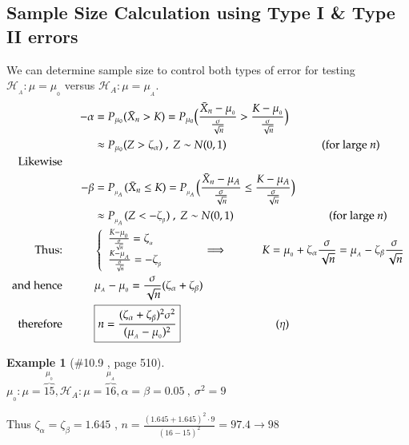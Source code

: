 \documentclass[14pt,twoside,a4paper,fleqn]{article}
\theoremstyle{plain}
\newtheorem{example}{Example}[section]
\begin{document}
\subsection{Sample Size Calculation using Type I \& Type II errors}
We can determine sample size to control both types of error for testing \mbox{$\mathcal{H}_{_A}:\mu=\mu_{_0}$} versus $\mathcal{H}_A: \mu = \mu_{_A}$.\\
\begin{equation*}
\begin{split}
	-\alpha &= P_{{{\mu}_0}} (\bar{X}_n > K) = P_{{{\mu}_0}} \big(\frac{\bar{X}_n - \mu_{_0}}{\frac{\sigma}{\sqrt{n}}} > \frac{K-\mu_{_0}}{\frac{\sigma}{\sqrt{n}}}\big) \\
	&\approx P_{{{\mu}_0}}(Z > \zeta_\alpha)\ , \ Z \sim N(0,1)\tab[3cm] \text{(for large $n$)}\\
	\text{Likewise}\tab &\\
	-\beta & = P_{_{\mu_{_A}}} (\bar{X}_n \leq K) = P_{_{\mu_{_A}}}\big(\frac{\bar{X}_n - \mu_A}{\frac{\sigma}{\sqrt{n}}} \leq \frac{K-\mu_A}{\frac{\sigma}{\sqrt{n}}}\big)\\
	&\approx  P_{_{\mu_{_A}}}(Z < -\zeta_{_\beta})\ , \ Z\sim N(0,1)\tab[3cm] \text{(for large $n$)}\\
\text{Thus:}\tab & \left\{ \begin{array}{lr}
	\frac{K-\mu_{_0}}{\frac{\sigma}{\sqrt{n}}}= \zeta_{_\alpha}\\
	\frac{K-\mu_{_A}}{\frac{\sigma}{\sqrt{n}}} = -\zeta_{_\beta}
\end{array}
\right.\tab \implies\tab K=\mu_{_0} +\zeta_\alpha \frac{\sigma}{\sqrt{n}} = \mu_{_A} - \zeta_\beta \frac{\sigma}{\sqrt{n}}   \\
\text{and hence}\tab & \mu_{_A} -\mu_{_0} = \frac{\sigma}{\sqrt{n}}(\zeta_\alpha + \zeta_\beta)\\
\text{therefore}\tab & \boxed{n = \frac{(\zeta_\alpha + \zeta_\beta)^2 \sigma^2}{(\mu_{_A} - \mu_{_0})^2}}\tab[3cm] (\eta)
\end{split}
\end{equation*}

\begin{example}[\#10.9 , page 510]\hfill\\
$
	\mu_{_0} : \mu = \overbrace{15}^{\mu_{_0}} , \mathcal{H}_A : \mu = \overbrace{16}^{\mu_{_A}} , \alpha=\beta=0.05 \ , \ \sigma^2 = 9
$
\end{example}
Thus $\zeta_\alpha = \zeta_\beta = 1.645$ \tab , \tab $n=\frac{(1.645+1.645)^2 \cdot 9}{(16-15)^2} = 97.4 \rightarrow 98$
\end{document}
